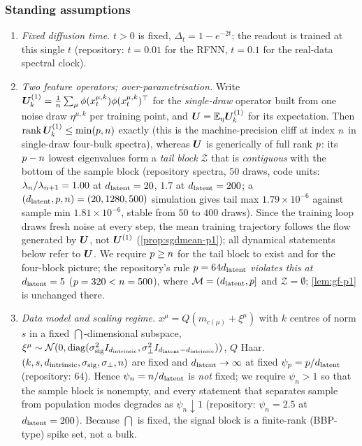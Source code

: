 \subsubsection{Standing assumptions}

\begin{assumption}\label{ass:standing-p1}
\begin{enumerate}
\item[(A1)] \emph{Fixed diffusion time.} $t>0$ is fixed, $\Delta_t=1-e^{-2t}$; the readout is trained at this single $t$ (repository: $t=0.01$ for the RFNN, $t=0.1$ for the real-data spectral clock).
\item[(A2)] \emph{Two feature operators; over-parametrisation.} Write $\bm{U}^{(1)}_k=\tfrac1{n}\sum_\mu\phi(x^{\mu,k}_t)\phi(x^{\mu,k}_t)^{\top}$ for the \emph{single-draw} operator built from one noise draw $\eta^{\mu,k}$ per training point, and $\bm{U}=\mathbb{E}_\eta\bm{U}^{(1)}_k$ for its expectation. Then $\operatorname{rank}\bm{U}^{(1)}_k\le\min(p,n)$ exactly (this is the machine-precision cliff at index $n$ in single-draw four-bulk spectra), whereas $\bm{U}$ is generically of full rank $p$: its $p-n$ lowest eigenvalues form a \emph{tail block} $\mathcal Z$ that is \emph{contiguous} with the bottom of the sample block (repository spectra, $50$ draws, code units: $\lambda_{n}/\lambda_{n+1}=1.00$ at $d_{\mathrm{latent}}=20$, $1.7$ at $d_{\mathrm{latent}}=200$; a $(d_{\mathrm{latent}},p,n)=(20,1280,500)$ simulation gives tail max $1.79\times10^{-6}$ against sample min $1.81\times10^{-6}$, stable from $50$ to $400$ draws). Since the training loop draws fresh noise at every step, the mean training trajectory follows the flow generated by $\bm{U}$, not $\bm{U}^{(1)}$ (\cref{prop:sgdmean-p1}); all dynamical statements below refer to $\bm{U}$. We require $p\ge n$ for the tail block to exist and for the four-block picture; the repository's rule $p=64d_{\mathrm{latent}}$ \emph{violates this at $d_{\mathrm{latent}}=5$} ($p=320<n=500$), where $\mathcal M=(d_{\mathrm{latent}},p]$ and $\mathcal Z=\emptyset$; \cref{lem:gf-p1} is unchanged there.
\item[(A3)] \emph{Data model and scaling regime.} $x^\mu=Q(m_{c(\mu)}+\xi^\mu)$ with $k$ centres of norm $s$ in a fixed $\dint$-dimensional subspace, $\xi^\mu\sim\mathcal N(0,\operatorname{diag}(\sigma_{\mathrm{sig}}^2I_{d_{\mathrm{intrinsic}}},\sigma_{\perp}^2I_{d_{\mathrm{latent}}-d_{\mathrm{intrinsic}}}))$, $Q$ Haar. $(k,s,d_{\mathrm{intrinsic}},\sigma_{\mathrm{sig}},\sigma_{\perp},n)$ are fixed and $d_{\mathrm{latent}}\to\infty$ at fixed $\psi_p=p/d_{\mathrm{latent}}$ (repository: $64$). Hence $\psi_n=n/d_{\mathrm{latent}}$ is \emph{not} fixed; we require $\psi_n>1$ so that the sample block is nonempty, and every statement that separates sample from population modes degrades as $\psi_n\downarrow1$ (repository: $\psi_n=2.5$ at $d_{\mathrm{latent}}=200$). Because $\dint$ is fixed, the signal block is a finite-rank (BBP-type) spike set, not a bulk.

\end{enumerate}
\end{assumption}
